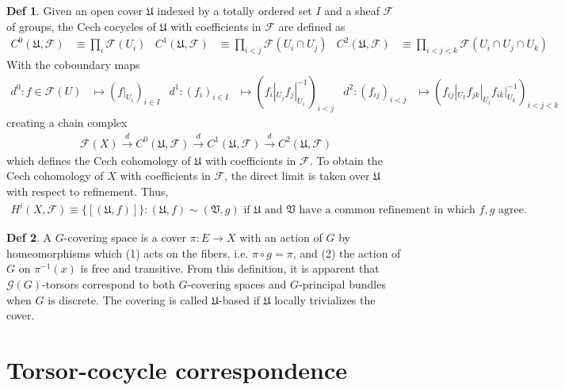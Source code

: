 \documentclass[11pt]{article}
\theoremstyle{definition}
\newtheorem{defn}{Def}
\begin{document}
\begin{defn}
Given an open cover $\mathfrak U$ indexed by a totally ordered set $I$ and a
sheaf $\mathcal F$ of groups, the Cech cocycles of $\mathfrak U$ with
coefficients in $\mathcal F$ are defined as
\begin{align}
  C^0(\mathfrak U, \mathcal F) &\equiv \prod_{i}\mathcal F(U_i) & C^1(\mathfrak U, \mathcal F) & \equiv \prod_{i < j}\mathcal F(U_i \cap U_j) & C^2(\mathfrak U, \mathcal F) &\equiv \prod_{i < j < k}\mathcal F(U_i \cap U_j \cap U_k)
\end{align}
With the coboundary maps
\begin{align}
  d^0 : f \in \mathcal F(U) &\mapsto (f|_{U_i})_{i \in I} & d^1:(f_i)_{i \in I} &\mapsto (f_i|_{U_j}f_j|_{U_i}^{-1})_{i < j} & d^2: (f_{ij})_{i < j} &\mapsto (f_{ij}|_{U_k} f_{jk}|_{U_i}f_{ik}|_{U_k}^{-1})_{i < j < k}
\end{align}
creating a chain complex
\begin{align}
\mathcal F(X) \xrightarrow{d} C^0(\mathfrak U, \mathcal F) \xrightarrow{d} C^1(\mathfrak U, \mathcal F) \xrightarrow{d} C^2(\mathfrak U, \mathcal F)
\end{align}
which defines the Cech cohomology of $\mathfrak U$ with coefficients in
$\mathcal F$. To obtain the Cech cohomology of $X$ with coefficients in
$\mathcal F$, the direct limit is taken over $\mathfrak U$ with respect to
refinement. Thus,
\begin{align}
H^i(X, \mathcal F) \equiv \{[(\mathfrak U, f)]\} : (\mathfrak U, f) \sim (\mathfrak V, g) \text{ if $\mathfrak U$ and $\mathfrak V$ have a common refinement in which $f,g$ agree.}
\end{align}
\end{defn}

\begin{defn}
  A $G$-covering space is a cover $\pi:E \to X$ with an action of $G$ by
  homeomorphisms which (1) acts on the fibers, i.e. $\pi \circ g = \pi$, and (2)
  the action of $G$ on $\pi^{-1}(x)$ is free and transitive. From this
  definition, it is apparent that $\mathcal G(G)$-torsors correspond to both
  $G$-covering spaces and $G$-principal bundles when $G$ is discrete. The
  covering is called $\mathfrak U$-based if $\mathfrak U$ locally trivializes
  the cover.
\end{defn}

\section{Torsor-cocycle correspondence}
\end{document}
